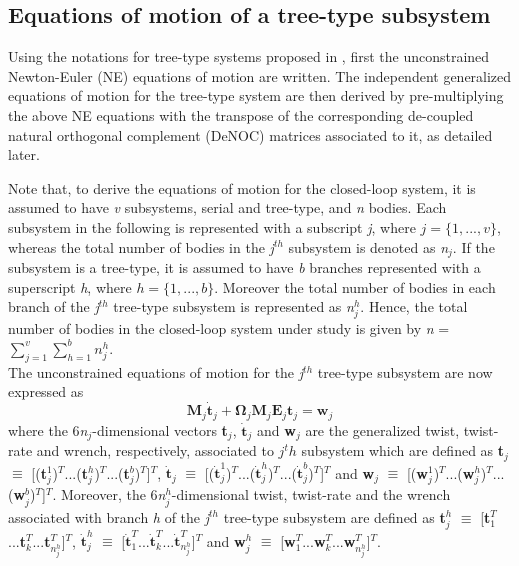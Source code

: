 \subsection{Equations of motion of a tree-type subsystem}
\label{c5eomtreess}
Using the notations for tree-type systems proposed in \citet{chaudhary2008dynamics}, first the unconstrained Newton-Euler (NE) equations of motion are written. The independent generalized equations of motion for the tree-type system are then derived by pre-multiplying the above NE equations with the transpose of the corresponding de-coupled natural orthogonal complement (DeNOC) matrices associated to it, as detailed later.

Note that, to derive the equations of motion for the closed-loop system, it is assumed to have \emph{v} subsystems, serial and tree-type, and \emph{n} bodies. Each subsystem in the following is represented with a subscript \emph{j}, where $j = \{1, ..., v\}$, whereas the total number of bodies in the \emph{j}$^{th}$ subsystem is denoted as \emph{n}$_j$. If the subsystem is a tree-type, it is assumed to have \emph{b} branches represented with a superscript \emph{h}, where $h = \{1,  ..., b\}$. Moreover the total number of bodies in each branch of the \emph{j}$^{th}$ tree-type subsystem is represented as \emph{n}$_j^h$. Hence, the total number of bodies in the closed-loop system under study is given by \emph{n} = $\sum\limits_{j=1}^{v}\sum\limits_{h=1}^{b}n_j^h$.\\
The unconstrained equations of motion for the \emph{j}$^{th}$ tree-type subsystem are now expressed as
\begin{equation}
\label{eqn:indp_eom}
\textbf{M}_j\dot{\textbf{t}}_j 
+ \mathbf{\Omega}_j\textbf{M}_j\textbf{E}_j\textbf{t}_j = \textbf{w}_j 
\end{equation}
where the 6\textit{n}$_j$-dimensional vectors \textbf{t}$_j$, $\dot{\textbf{t}}_j$ and \textbf{w}$_j$ are the generalized twist, twist-rate and wrench, respectively, associated to $j^th$ subsystem which are defined as \textbf{t}$_j$ $\equiv$ [(\textbf{t}$_{j}^{1}$)$^T$...(\textbf{t}$_{j}^{h}$)$^T$...(\textbf{t}$_{j}^{b}$)$^T$]$^T$, $\dot{\textbf{t}}_j$ $\equiv$ [($\dot{\textbf{t}}_{j}^{1}$)$^T$...($\dot{\textbf{t}}_{j}^{h}$)$^T$...($\dot{\textbf{t}}_{j}^{b}$)$^T$]$^T$ and \textbf{w}$_j$ $\equiv$ [(\textbf{w}$_{j}^{1}$)$^T$...(\textbf{w}$_{j}^{h}$)$^T$...\\(\textbf{w}$_{j}^{b}$)$^T$]$^T$. Moreover, the 6\textit{n}$_j^h$-dimensional twist, twist-rate and the wrench associated with branch \emph{h} of the \emph{j}$^{th}$ tree-type subsystem are defined as \textbf{t}$_j^h$ $\equiv$ [\textbf{t}$_1^T$...\textbf{t}$_k^T$...\textbf{t}$_{n_{j}^{h}}^T$]$^T$, $\dot{\textbf{t}}_j^h$ $\equiv$ [$\dot{\textbf{t}}_1^T$...$\dot{\textbf{t}}_k^T$...$\dot{\textbf{t}}_{n_{j}^{h}}^T$]$^T$ and \textbf{w}$_j^h$ $\equiv$ [\textbf{w}$_1^T$...\textbf{w}$_k^T$...\textbf{w}$_{n_{j}^{h}}^T$]$^T$.
